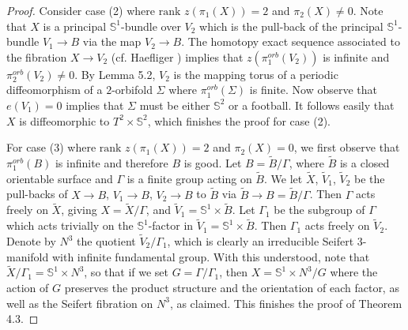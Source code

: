 \documentclass[11pt]{amsart}
\theoremstyle{plain}
\numberwithin{theorem}{section}
\theoremstyle{definition}
\begin{document}
\begin{proof}
Consider case (2) where $\text{rank }z(\pi_1(X))=2$ and $\pi_2(X)\neq 0$.  Note that 
$X$ is a principal ${{\mathbb S}}^1$-bundle over $V_2$ which is the pull-back of the principal ${{\mathbb S}}^1$-bundle
$V_1\rightarrow B$ via the map $V_2\rightarrow B$. The homotopy exact sequence associated
to the fibration $X\rightarrow V_2$ (cf. Haefliger \cite{Hae2}) implies that $z(\pi_1^{orb}(V_2))$ 
is infinite and 
$\pi_2^{orb}(V_2)\neq 0$. By Lemma 5.2, $V_2$ is the mapping torus of a periodic diffeomorphism 
of a $2$-orbifold $\Sigma$ where $\pi_1^{orb}(\Sigma)$ is finite. Now observe that $e(V_1)=0$ 
implies that $\Sigma$ must be either ${{\mathbb S}}^2$ or a football. It follows 
easily that $X$ is diffeomorphic to $T^2\times {{\mathbb S}}^2$, which finishes the proof for case (2).

For case (3) where $\text{rank }z(\pi_1(X))=2$ and $\pi_2(X)=0$, we first observe that 
$\pi_1^{orb}(B)$
is infinite and therefore $B$ is good.  Let $B=\tilde{B}/\Gamma$, where $\tilde{B}$ is a closed 
orientable surface and $\Gamma$ is a finite group acting on $\tilde{B}$. We let
$\tilde{X}$, $\tilde{V}_1$, $\tilde{V}_2$ be the pull-backs of $X\rightarrow B$, $V_1\rightarrow B$, $V_2\rightarrow B$ to $\tilde{B}$ via $\tilde{B}\rightarrow B=\tilde{B}/\Gamma$. Then $\Gamma$ 
acts freely on $\tilde{X}$, giving $X=\tilde{X}/\Gamma$, and $\tilde{V}_1={{\mathbb S}}^1\times \tilde{B}$. 
Let $\Gamma_1$ be the subgroup of $\Gamma$ which acts trivially on the ${{\mathbb S}}^1$-factor in 
$\tilde{V}_1={{\mathbb S}}^1\times \tilde{B}$. Then $\Gamma_1$ acts freely on $\tilde{V}_2$. Denote by $N^3$ the quotient $\tilde{V}_2/\Gamma_1$, which is clearly an irreducible Seifert $3$-manifold with 
infinite fundamental group. With this understood, note that $\tilde{X}/\Gamma_1={{\mathbb S}}^1\times N^3$, 
so that if we set $G=\Gamma/\Gamma_1$, then  $X={{\mathbb S}}^1\times N^3/G$ where the action of $G$ 
preserves the product structure and the orientation of each factor, as well as the Seifert fibration 
on $N^3$, as claimed. This finishes the proof of Theorem 4.3.

\end{proof}
\end{document}
